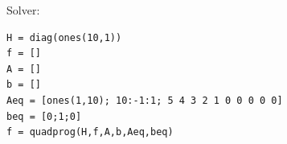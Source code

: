 \documentclass[12pt,letter]{article}
\begin{document}
\begin{enumerate}
\begin{itemize}
    Solver:
\begin{verbatim}
H = diag(ones(10,1))
f = []
A = []
b = []
Aeq = [ones(1,10); 10:-1:1; 5 4 3 2 1 0 0 0 0 0]
beq = [0;1;0]
f = quadprog(H,f,A,b,Aeq,beq)
\end{verbatim}

  \end{itemize}
\end{enumerate}
\end{document}
